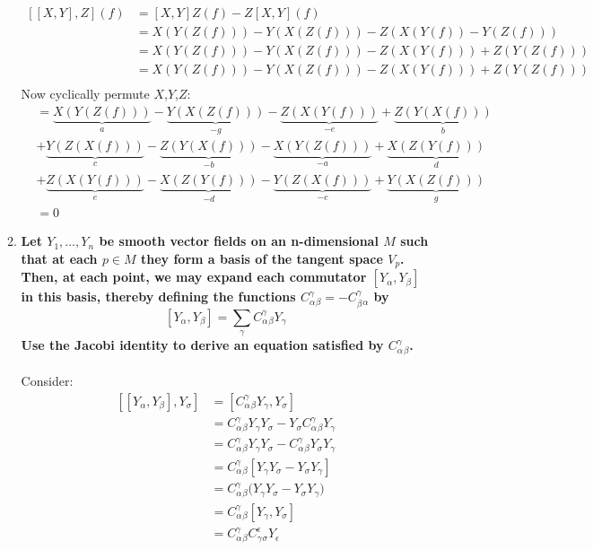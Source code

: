 \documentclass[9pt]{report}
\begin{document}
\begin{enumerate}
\begin{enumerate}
\[\begin{align}
      [[X,Y],Z](f) &= [X,Y]Z(f)-Z[X,Y](f)\\
                   &= X(Y(Z(f)))-Y(X(Z(f)))-Z(X(Y(f))-Y(Z(f))) \\
                   &= X(Y(Z(f)))-Y(X(Z(f)))-Z(X(Y(f)))+Z(Y(Z(f))) \\
                   &= X(Y(Z(f)))-Y(X(Z(f)))-Z(X(Y(f)))+Z(Y(Z(f))) \\
    \end{align}
  \]
  Now cyclically permute $X$,$Y$,$Z$:
  \[
    \begin{align}
                   &= \underbrace{X(Y(Z(f)))}_a-\underbrace{Y(X(Z(f)))}_{-g}-\underbrace{Z(X(Y(f)))}_{-e}+\underbrace{Z(Y(X(f)))}_b \\
                   &+ \underbrace{Y(Z(X(f)))}_c-\underbrace{Z(Y(X(f)))}_{-b}-\underbrace{X(Y(Z(f)))}_{-a}+\underbrace{X(Z(Y(f)))}_d \\
                   &+ \underbrace{Z(X(Y(f)))}_e-\underbrace{X(Z(Y(f)))}_{-d}-\underbrace{Y(Z(X(f)))}_{-c}+\underbrace{Y(X(Z(f)))}_g \\
                   &= 0
    \end{align}
  \]
\item \textbf{Let $Y_1,\ldots,Y_n$ be smooth vector fields on an n-dimensional
  $M$ such that at each $p\in M$ they form a basis of the tangent space $V_p$.
Then, at each point, we may expand each commutator $[Y_\alpha, Y_\beta]$ in
this basis, thereby defining the functions $C^\gamma_\alpha_\beta=-C^\gamma_\beta_\alpha$ by}
\[
  [Y_\alpha, Y_\beta] = \sum_\gamma C^\gamma_\alpha_\beta Y_\gamma
\]
  \textbf{Use the Jacobi identity to derive an equation satisfied by $C^\gamma_\alpha_\beta$.}\\\\
  Consider:
  \[
    \begin{align*}
      [[Y_\alpha, Y_\beta], Y_\sigma] &= [C^\gamma_\alpha_\beta Y_\gamma,Y_\sigma]\\
    &= C^\gamma_\alpha_\beta Y_\gamma Y_\sigma - Y_\sigma C^\gamma_\alpha_\beta Y_\gamma \\
    &= C^\gamma_\alpha_\beta Y_\gamma Y_\sigma - C^\gamma_\alpha_\beta Y_\sigma Y_\gamma \\
    &= C^\gamma_\alpha_\beta [Y_\gamma Y_\sigma - Y_\sigma Y_\gamma] \\
    &= C^\gamma_\alpha_\beta \Big(Y_\gamma Y_\sigma - Y_\sigma Y_\gamma\Big) \\
    &= C^\gamma_\alpha_\beta [Y_\gamma, Y_\sigma] \\
    &= C^\gamma_\alpha_\beta C^\epsilon_\gamma_\sigma Y_\epsilon \\

\end{align*}\]
\end{enumerate}
\end{enumerate}
\end{document}
